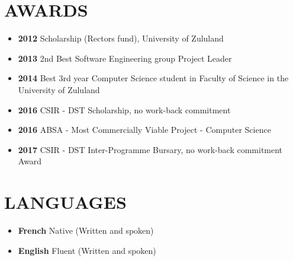 \documentclass[margin]{res}
\begin{document}
\begin{resume}
\section{AWARDS}
\begin{itemize}
\item \textbf{2012} Scholarship (Rector\textsc{}s fund), University of Zululand  
\item \textbf{2013} 2nd Best Software Engineering group Project Leader 
\item \textbf{2014} Best 3rd year Computer Science student in Faculty of Science in the University of 
Zululand
\item \textbf{2016} CSIR - DST Scholarship, no work-back commitment
\item \textbf{2016} ABSA - Most Commercially Viable Project - Computer Science
\item \textbf{2017} CSIR - DST Inter-Programme Bursary, no work-back commitment Award
\end{itemize}


\section{LANGUAGES}
\begin{itemize}
\item \textbf{French} Native (Written and spoken)
\item \textbf{English} Fluent (Written and spoken)
\end{itemize}



\end{resume}
\end{document}
